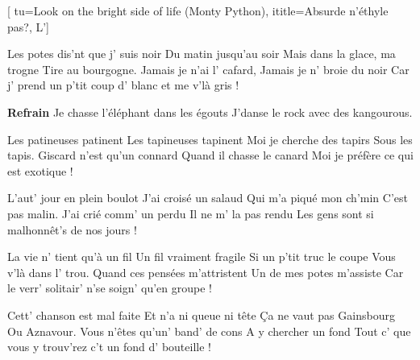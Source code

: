[
  tu={Look on the bright side of life (Monty Python)},
  ititle={Absurde n'éthyle pas?, L'}]


\beginverse
Les potes dis'nt que j' suis noir
Du matin jusqu'au soir
Mais dans la glace, ma trogne
Tire au bourgogne.
Jamais je n'ai l' cafard,
Jamais je n' broie du noir
Car j' prend un p'tit coup d' blanc et me v'là gris !
\endverse

\beginchorus
\textbf{Refrain}
Je chasse l'éléphant dans les égouts
J'danse le rock avec des kangourous.
\endchorus

\beginverse
Les patineuses patinent
Les tapineuses tapinent
Moi je cherche des tapirs
Sous les tapis.
Giscard n'est qu'un connard
Quand il chasse le canard
Moi je préfère ce qui est exotique !
\endverse

\beginverse
L'aut' jour en plein boulot
J'ai croisé un salaud
Qui m'a piqué mon ch'min
C'est pas malin.
J'ai crié comm' un perdu
Il ne m' la pas rendu
Les gens sont si malhonnêt's de nos jours !
\endverse

\beginverse
La vie n' tient qu'à un fil
Un fil vraiment fragile
Si un p'tit truc le coupe
Vous v'là dans l' trou.
Quand ces pensées m'attristent
Un de mes potes m'assiste
Car le verr' solitair' n'se soign' qu'en groupe !
\endverse

\beginverse
Cett' chanson est mal faite
Et n'a ni queue ni tête
Ça ne vaut pas Gainsbourg
Ou Aznavour.
Vous n'êtes qu'un' band' de cons
A y chercher un fond
Tout c' que vous y trouv'rez c't un fond d' bouteille !
\endverse

\endsong
